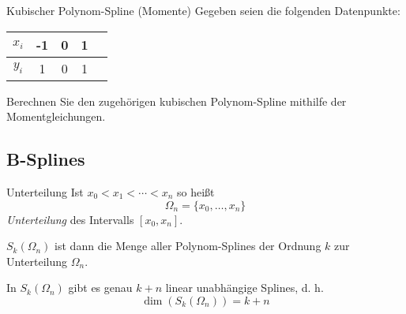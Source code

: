 \begin{example}{Kubischer Polynom-Spline (Momente)}
    Gegeben seien die folgenden Datenpunkte: 
    
    \begin{center}
        \begin{tabular}{|c||c|c|c|c|}
            \hline
            $x_i$ & -1 & 0 & 1 \\ 
            \hline
            $y_i$ & 1  & 0 & 1 \\
            \hline
        \end{tabular}
    \end{center}
    
    Berechnen Sie den zugehörigen kubischen Polynom-Spline mithilfe der Momentgleichungen.
    
    \exampleseparator
\end{example}

\subsection{B-Splines}

\begin{defi}{Unterteilung}
    Ist $x_0 < x_1 < \cdots < x_n$ so heißt  
    \[ 
        \Omega_n = \{ x_0, \ldots, x_n \}
    \]
    \emph{Unterteilung} des Intervalls $[x_0, x_n]$. 
    
    $S_k(\Omega_n)$ ist dann die Menge aller Polynom-Splines der Ordnung $k$ zur Unterteilung $\Omega_n$.
    
    In $S_k(\Omega_n)$ gibt es genau $k+n$ linear unabhängige Splines, d. h. 
    \[ 
        \dim(S_k(\Omega_n)) = k + n
    \]
\end{defi}

